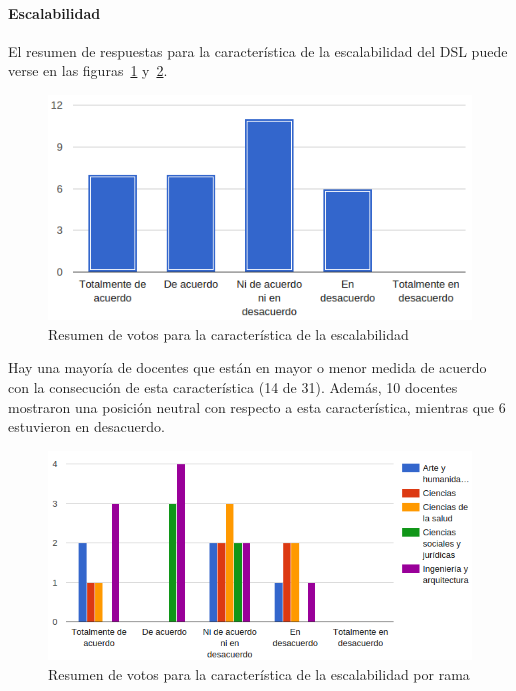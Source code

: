 \newpage
\paragraph*{Escalabilidad}

El resumen de respuestas para la característica de la escalabilidad del DSL puede verse en las figuras~\ref{fig:evalmetodo:dsl:escalabilidad} y~\ref{fig:evalmetodo:dsl:escalabilidad:rama}.

\begin{figure}[h]
  \begin{center}
    \includegraphics[scale=0.5]{C_DSL_escalabilidad.png}
  \end{center}
  \caption{Resumen de votos para la característica de la escalabilidad}
  \label{fig:evalmetodo:dsl:escalabilidad}
\end{figure}

Hay una mayoría de docentes que están en mayor o menor medida de acuerdo con la consecución de esta característica (14 de 31). Además, 10 docentes mostraron una posición neutral con respecto a esta característica, mientras que 6 estuvieron en desacuerdo.

\begin{figure}[h]
  \begin{center}
    \includegraphics[scale=0.5]{C_DSL_escalabilidad_rama.png}
  \end{center}
  \caption{Resumen de votos para la característica de la escalabilidad por rama}
  \label{fig:evalmetodo:dsl:escalabilidad:rama}
\end{figure}

